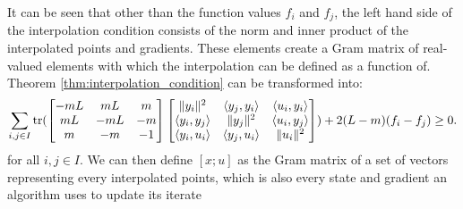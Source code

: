 It can be seen that other than the function values $f_i$ and $f_j$, the left hand side of the interpolation condition consists of the norm and inner product of the interpolated points and gradients. These elements create a Gram matrix of real-valued elements with which the interpolation can be defined as a function of. Theorem \ref{thm:interpolation_condition} can be transformed into:
\begin{equation} \label{eqn:condGram}
	\sum_{i,j\in I} \operatorname{\mathrm{tr}}(\begin{bmatrix}-mL & mL & m \\ mL & -mL & -m\\m & -m & -1\end{bmatrix}\begin{bmatrix}\|y_i\|^2 & \langle y_j, y_i \rangle & \langle u_i, y_i \rangle \\ \langle y_i, y_j \rangle & \|y_j\|^2 & \langle u_i, y_j \rangle \\ \langle y_i, u_i \rangle & \langle y_j, u_i \rangle & \|u_i\|^2\end{bmatrix}) + 2(L-m)(f_i - f_j) \geq 0.
\end{equation}
for all $i,j\in I$. We can then define $[x; u]$ as the Gram matrix of a set of vectors representing every interpolated points, which is also every state and gradient an algorithm uses to update its iterate


